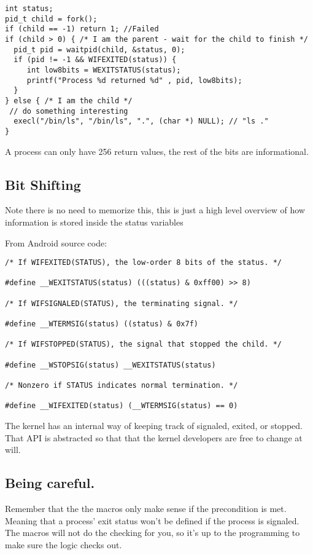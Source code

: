 \begin{verbatim}
int status;
pid_t child = fork();
if (child == -1) return 1; //Failed
if (child > 0) { /* I am the parent - wait for the child to finish */
  pid_t pid = waitpid(child, &status, 0);
  if (pid != -1 && WIFEXITED(status)) {
     int low8bits = WEXITSTATUS(status);
     printf("Process %d returned %d" , pid, low8bits);
  }
} else { /* I am the child */
 // do something interesting
  execl("/bin/ls", "/bin/ls", ".", (char *) NULL); // "ls ."
}
\end{verbatim}

A process can only have 256 return values, the rest of the bits are
informational.

\subsection{Bit Shifting}\label{bit-shifting}

Note there is no need to memorize this, this is just a high level
overview of how information is stored inside the status variables

From Android source code:

\begin{verbatim}
/* If WIFEXITED(STATUS), the low-order 8 bits of the status. */

#define __WEXITSTATUS(status) (((status) & 0xff00) >> 8)

/* If WIFSIGNALED(STATUS), the terminating signal. */

#define __WTERMSIG(status) ((status) & 0x7f)

/* If WIFSTOPPED(STATUS), the signal that stopped the child. */

#define __WSTOPSIG(status) __WEXITSTATUS(status)

/* Nonzero if STATUS indicates normal termination. */

#define __WIFEXITED(status) (__WTERMSIG(status) == 0)
\end{verbatim}

The kernel has an internal way of keeping track of signaled, exited, or
stopped. That API is abstracted so that that the kernel developers are
free to change at will.

\subsection{Being careful.}\label{being-careful.}

Remember that the the macros only make sense if the precondition is met.
Meaning that a process' exit status won't be defined if the process is
signaled. The macros will not do the checking for you, so it's up to the
programming to make sure the logic checks out.


